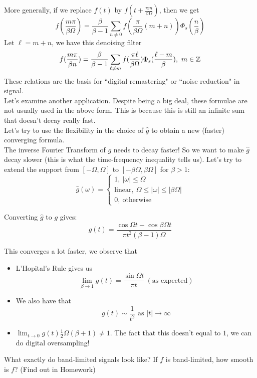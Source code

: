 \documentclass{article}
\begin{document}
More generally, if we replace $f(t)$ by $f(t + \frac{\pi m}{\beta \Omega})$, then we get
\[f(\frac{m \pi}{\beta \Omega}) = \frac{\beta}{\beta - 1} \sum_{n \neq 0} f(\frac{\pi}{\beta \Omega}(m + n)) \Phi_s(\frac{n}{\beta}) \]
Let $\ell = m + n$, we have this denoising filter
\[f(\frac{m \pi}{\beta n}) = \frac{\beta}{\beta - 1} \sum_{\ell \neq m} f(\frac{\pi \ell}{\beta \Omega}) \Phi_s(\frac{\ell - m}{\beta}),\ m \in \mathbb{Z}\]
These relations are the basis for ``digital remastering" or ``noise reduction" in signal.\\

Let's examine another application. Despite being a big deal, these formulae are not usually used in the above form. This is because this is still an infinite sum that doesn't decay really fast.\\

Let's try to use the flexibility in the choice of $\widehat{g}$ to obtain a new (faster) converging formula.\\

The inverse Fourier Transform of $g$ needs to decay faster! So we want to make $\widehat{g}$ decay slower (this is what the time-frequency inequality tells us). Let's try to extend the support from $[-\Omega, \Omega]$ to $[-\beta \Omega, \beta \Omega]$ for $\beta > 1$:
\[\widehat{g}(\omega) = \begin{cases}
    1,\ |\omega| \leq \Omega\\
    \text{linear},\ \Omega \leq |\omega| \leq |\beta \Omega|\\
    0,\ \text{otherwise}
\end{cases}\]

Converting $\widehat{g}$ to $g$ gives:
\[g(t) = \frac{\cos \Omega t - \cos \beta \Omega t}{\pi t^2 (\beta - 1) \Omega}\]

This converges a lot faster, we observe that
\begin{itemize}
    \item L'Hopital's Rule gives us 
 \[\lim_{\beta \to 1} g(t) = \frac{\sin \Omega t}{\pi t}\ (\text{as expected})\]   
    \item We also have that
\[g(t) \sim \frac{1}{t^2} \text{ as } |t| \to \infty \]
\item $\lim_{t \to 0} g(t) \frac{1}{2} \Omega (\beta + 1) \neq 1$. The fact that this doesn't equal to $1$, we can do digital oversampling!
\end{itemize}

\begin{question}
    What exactly do band-limited signals look like? If $f$ is band-limited, how smooth is $f$? (Find out in Homework)
\end{question}
\end{document}

